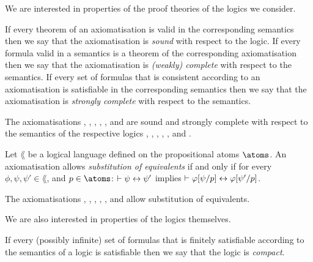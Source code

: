 
We are interested in properties of the proof theories of the logics we consider.

\begin{definition}
If every theorem of an axiomatisation is valid in the corresponding semantics then we say that the axiomatisation is {\em sound} with respect to the logic.
If every formula valid in a semantics is a theorem of the corresponding axiomatisation then we say that the axiomatisation is {\em (weakly) complete} with respect to the semantics.
If every set of formulas that is consistent according to an axiomatisation is satisfiable in the corresponding semantics then we say that the axiomatisation is {\em strongly complete} with respect to the semantics.
\end{definition}

\begin{proposition}
The axiomatisations \axiomK{}, \axiomKF{}, \axiomKFF{}, \axiomKD{}, \axiomSF{}, and \axiomS{} are sound and strongly complete with respect to the semantics of the respective logics \logicK{}, \logicKF{}, \logicKFF{}, \logicKD{}, \logicSF{}, and \logicS{}.
\end{proposition}


\begin{definition}
Let $\lang$ be a logical language defined on the propositional atoms $\atoms$.
An axiomatisation allows {\em substitution of equivalents} if and only if for every $\phi, \psi, \psi' \in \lang$, and $\atomP \in \atoms$: $\vdash \psi \leftrightarrow \psi'$ implies $\vdash \varphi[\psi/p] \leftrightarrow \varphi[\psi'/p]$.
\end{definition}

\begin{proposition}
The axiomatisations \axiomK{}, \axiomKF{}, \axiomKFF{}, \axiomKD{}, \axiomSF{}, and \axiomS{} allow substitution of equivalents.
\end{proposition}

We are also interested in properties of the logics themselves.

\begin{definition}[Compactness]
If every (possibly infinite) set of formulas that is finitely satisfiable according to the semantics of a logic is satisfiable then we say that the logic is {\em compact}.
\end{definition}


